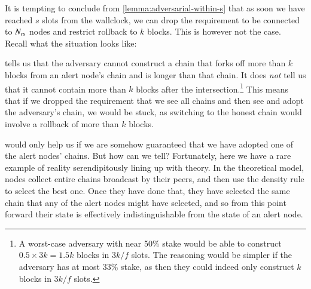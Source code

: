It is tempting to conclude from \cref{lemma:adversarial-within-s} that as soon
we have reached $s$ slots from the wallclock, we can drop the requirement to be
connected to $N_\mathit{rs}$ nodes and restrict rollback to  $k$ blocks. This
is however not the case. Recall what the situation looks like:
%
\begin{center}
\end{center}
%
 tells us that the adversary cannot construct a
chain that forks off more than $k$ blocks from an alert node's chain and is
longer than that chain. It does \emph{not} tell us that it cannot contain more
than $k$  blocks after the intersection.\footnote{A worst-case adversary with
near 50\% stake would be able to construct $0.5 \times 3k = 1.5k$ blocks in
$3k/f$ slots. The reasoning would be simpler if the adversary has at most 33\%
stake, as then they could indeed only construct $k$ blocks in $3k/f$ slots.}
This means that if we dropped the requirement that we see all chains and then
see and adopt the adversary's chain, we would be stuck, as switching to the
honest chain would involve a rollback of more than $k$ blocks.

 would only help us if we are somehow
guaranteed that we have adopted one of the alert nodes' chains. But how can we
tell? Fortunately, here we have a rare example of reality serendipitously lining
up with theory. In the theoretical model, nodes collect entire chains broadcast
by their peers, and then use the density rule to select the best one. Once they
have done that, they have selected the same chain that any of the alert nodes
might have selected, and so from this point forward their state is effectively
indistinguishable from the state of an alert node.

